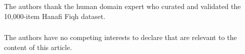 \documentclass[runningheads]{llncs}
\begin{document}

\begin{credits}
\subsubsection{\ackname} The authors thank the human domain expert who curated and validated the 10{,}000-item Hanafi Fiqh dataset.

\subsubsection{\discintname} The authors have no competing interests to declare that are relevant to the content of this article.
\end{credits}



\end{document}
